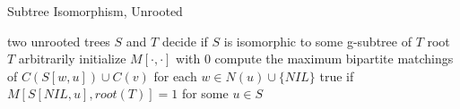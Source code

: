 \documentclass[handout]{beamer}
\begin{document}
\begin{frame}{Subtree Isomorphism, Unrooted}
\begin{algorithm}[H] 
	\caption{Unooted Subtree Isomorphism} 
	\begin{algorithmic}[1] 
		\Require two unrooted trees $S$ and $T$
		\Ensure decide if $S$ is isomorphic to some g-subtree of $T$
		\State root $T$ arbitrarily
		\State initialize $M[\cdot, \cdot]$ with 0
		\State compute the maximum bipartite matchings of $C(S[w, u]) \cup C(v)$ for each $w \in N(u) \cup \{NIL\}$
		\EndFor
		\EndFor
		\State \Return true if $M[S[NIL, u], root(T)] = 1$ for some $u \in S$
	\end{algorithmic} 
\end{algorithm}
\end{frame}
\end{document}
